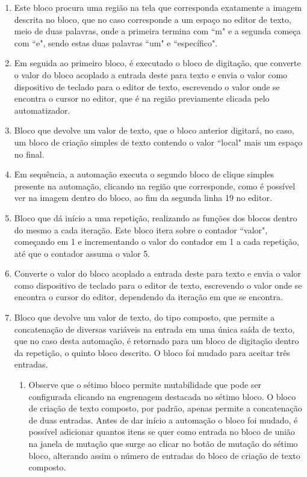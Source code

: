 \documentclass[tg]{mdtufsm}
\begin{document}
                \begin{enumerate}[label*=\arabic*.]
                    \item Este bloco procura uma região na tela que corresponda exatamente a imagem descrita no bloco, que no caso corresponde a um espaço no editor de texto, meio de duas palavras, onde a primeira termina com ``m" e a segunda começa com ``e", sendo estas duas palavras ``um" e ``específico".
                    \item Em seguida ao primeiro bloco, é executado o bloco de digitação, que converte o valor do bloco acoplado a entrada deste para texto e envia o valor como dispositivo de teclado para o editor de texto, escrevendo o valor onde se encontra o cursor no editor, que é na região previamente clicada pelo automatizador.
                    \item Bloco que devolve um valor de texto, que o bloco anterior digitará, no caso, um bloco de criação simples de texto contendo o valor ``local" mais um espaço no final.
                    \item Em sequência, a automação executa o segundo bloco de clique simples presente na automação, clicando na região que corresponde, como é possível ver na imagem dentro do bloco, ao fim da segunda linha 19 no editor.
                    \item Bloco que dá início a uma repetição, realizando as funções dos blocos dentro do mesmo a cada iteração. Este bloco itera sobre o contador ``valor", começando em 1 e incrementando o valor do contador em 1 a cada repetição, até que o contador assuma o valor 5.
                    \item Converte o valor do bloco acoplado a entrada deste para texto e envia o valor como dispositivo de teclado para o editor de texto, escrevendo o valor onde se encontra o cursor do editor, dependendo da iteração em que se encontra.
                    \item Bloco que devolve um valor de texto, do tipo composto, que permite a concatenação de diversas variáveis na entrada em uma única saída de texto, que no caso desta automação, é retornado para um bloco de digitação dentro da repetição, o quinto bloco descrito. O bloco foi mudado para aceitar três entradas.
                    \begin{enumerate}[label*=\arabic*.]
                        \item Observe que o sétimo bloco permite mutabilidade que pode ser configurada clicando na engrenagem destacada no sétimo bloco. O bloco de criação de texto composto, por padrão, apenas permite a concatenação de duas entradas. Antes de dar início a automação o bloco foi mudado, é possível adicionar quantos itens se quer como entrada no bloco de união na janela de mutação que surge ao clicar no botão de mutação do sétimo bloco, alterando assim o número de entradas do bloco de criação de texto composto.

\end{enumerate}
\end{enumerate}
\end{document}
